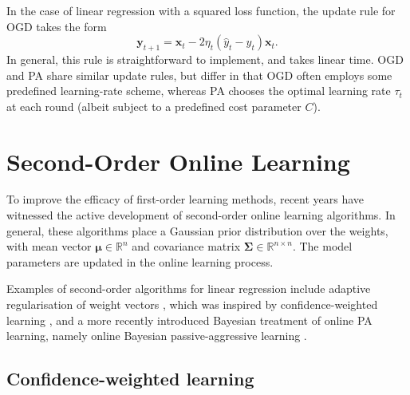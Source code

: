 In the case of linear regression with a squared loss function, the update rule for OGD takes the form
\begin{equation}
	\mathbf{y}_{t+1} = \mathbf{x}_t - 2\eta_t (\hat{y}_t - y_t)\mathbf{x}_t.
\end{equation} 
In general, this rule is straightforward to implement, and takes linear time. OGD and PA share similar update rules, but differ in that OGD often employs some predefined learning-rate scheme, whereas PA chooses the optimal learning rate $\tau_t$ at each round (albeit subject to a predefined cost parameter $C$).




\section{Second-Order Online Learning}


To improve the efficacy of first-order learning methods, recent years have witnessed the active development of second-order online learning algorithms. In general, these algorithms place a Gaussian prior distribution over the weights, with mean vector $\boldsymbol{\mu} \in \mathbb{R}^n$ and covariance matrix $\boldsymbol{\Sigma} \in \mathbb{R}^{n \times n}$. The model parameters are updated in the online learning process.

Examples of second-order algorithms for linear regression include adaptive regularisation of weight vectors \citep{arow}, which was inspired by confidence-weighted learning \citep{dredze08}, and a more recently introduced Bayesian treatment of online PA learning, namely online Bayesian passive-aggressive learning \citep{bayespa}.

\subsection{Confidence-weighted learning}

